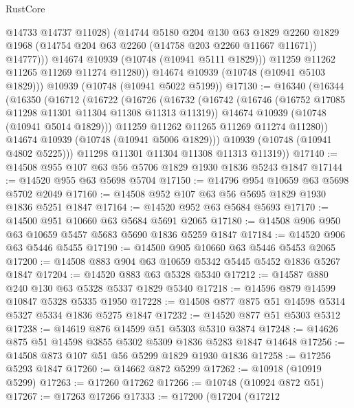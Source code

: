 \begin{lexlean}{RustCore}
\begin{coremodule}
                  @14733
                  @14737
                  @11028)
                (@14744
                  @5180
                  @204
                  @130
                  @63
                  @1829
                  @2260
                  @1829
                  @1968
                  (@14754 @204 @63 @2260 (@14758 @203 @2260 @11667 @11671))
                  @14777)))
            @14674
            @10939
            (@10748 (@10941 @5111 @1829)))
          @11259
          @11262
          @11265
          @11269
          @11274
          @11280))
      @14674
      @10939
      (@10748 (@10941 @5103 @1829)))
    @10939
    (@10748 (@10941 @5022 @5199))
@17130 := @16340
    (@16344
      (@16350
        (@16712
          (@16722
            (@16726
              (@16732
                (@16742
                  (@16746 (@16752 @17085 @11298 @11301 @11304 @11308 @11313 @11319))
                  @14674
                  @10939
                  (@10748 (@10941 @5014 @1829)))
                @11259
                @11262
                @11265
                @11269
                @11274
                @11280))
            @14674
            @10939
            (@10748 (@10941 @5006 @1829)))
          @10939
          (@10748 (@10941 @4802 @5225)))
        @11298
        @11301
        @11304
        @11308
        @11313
        @11319))
@17140 := @14508 @955 @107 @63 @56 @5706 @1829 @1930 @1836 @5243 @1847
@17144 := @14520 @955 @63 @5698 @5704
@17150 := @14796 @954 @10659 @63 @5698 @5702 @2049
@17160 := @14508 @952 @107 @63 @56 @5695 @1829 @1930 @1836 @5251 @1847
@17164 := @14520 @952 @63 @5684 @5693
@17170 := @14500 @951 @10660 @63 @5684 @5691 @2065
@17180 := @14508 @906 @950 @63 @10659 @5457 @5683 @5690 @1836 @5259 @1847
@17184 := @14520 @906 @63 @5446 @5455
@17190 := @14500 @905 @10660 @63 @5446 @5453 @2065
@17200 := @14508 @883 @904 @63 @10659 @5342 @5445 @5452 @1836 @5267 @1847
@17204 := @14520 @883 @63 @5328 @5340
@17212 := @14587 @880 @240 @130 @63 @5328 @5337 @1829 @5340
@17218 := @14596 @879 @14599 @10847 @5328 @5335 @1950
@17228 := @14508 @877 @875 @51 @14598 @5314 @5327 @5334 @1836 @5275 @1847
@17232 := @14520 @877 @51 @5303 @5312
@17238 := @14619 @876 @14599 @51 @5303 @5310 @3874
@17248 := @14626 @875 @51 @14598 @3855 @5302 @5309 @1836 @5283 @1847 @14648
@17256 := @14508 @873 @107 @51 @56 @5299 @1829 @1930 @1836
@17258 := @17256 @5293 @1847
@17260 := @14662 @872 @5299
@17262 := @10918 (@10919 @5299)
@17263 := @17260 @17262
@17266 := @10748 (@10924 @872 @51)
@17267 := @17263 @17266
@17333 := @17200
    (@17204
      (@17212

\end{coremodule}
\end{lexlean}
